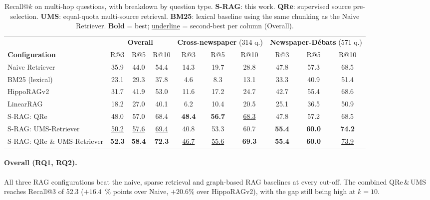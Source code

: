 \begin{table}[ht]
\centering
\small
\setlength{\tabcolsep}{4pt}
\begin{tabular*}{\textwidth}{@{\extracolsep{\fill}} l ccc ccc ccc @{}}
\toprule
 & \multicolumn{3}{c}{\textbf{Overall}} & \multicolumn{3}{c}{\textbf{Cross-newspaper} (314 q.)} & \multicolumn{3}{c}{\textbf{Newspaper-Débats} (571 q.)} \\
\cmidrule(lr){2-4} \cmidrule(lr){5-7} \cmidrule(lr){8-10}
\textbf{Configuration} & R@3 & R@5 & R@10 & R@3 & R@5 & R@10 & R@3 & R@5 & R@10 \\
\midrule
Naive Retriever~\cite{historiqa-pellet}              & 35.9 & 44.0 & 54.4 & 14.3 & 19.7 & 28.8 & 47.8 & 57.3 & 68.5 \\
BM25 (lexical)~\cite{bm25}                    & 23.1 & 29.3 & 37.8 &  4.6 &  8.3 & 13.1 & 33.3 & 40.9 & 51.4 \\
HippoRAGv2~\cite{hipporagv2}                  & 31.7 & 41.9 & 53.0 & 11.6 & 17.2 & 24.7 & 42.7 & 55.4 & 68.6 \\
LinearRAG~\cite{linearrag_2025}               & 18.2 & 27.0 & 40.1 & 6.2 & 10.4 & 20.5 & 25.1 & 36.5 & 50.9 \\
\midrule
S-RAG: QRe                                    & 48.0 & 57.0 & 68.4 & \textbf{48.4} & \textbf{56.7} & \underline{68.3} & 47.8 & 57.2 & 68.5 \\
S-RAG: UMS-Retriever                          & \underline{50.2} & \underline{57.6} & \underline{69.4} & 40.8 & 53.3 & 60.7 & \textbf{55.4} & \textbf{60.0} & \textbf{74.2} \\
S-RAG: QRe \& UMS-Retriever                   & \textbf{52.3} & \textbf{58.4} & \textbf{72.3} & \underline{46.7} & \underline{55.6} & \textbf{69.3} & \textbf{55.4} & \textbf{60.0} & \underline{73.9} \\
\bottomrule
\end{tabular*}
\caption{Recall@$k$ on multi-hop questions, with breakdown by question type.
\textbf{S-RAG}: this work. \textbf{QRe}: supervised source pre-selection.
\textbf{UMS}: equal-quota multi-source retrieval.
\textbf{BM25}: lexical baseline using the same chunking as the Naive Retriever.
\textbf{Bold} = best; \underline{underline} = second-best per column (Overall).}
\label{tab:retrieval-results}
\end{table}

\paragraph{Overall (RQ1, RQ2).}
All three RAG configurations beat the naive, sparse retrieval and graph-based RAG baselines at every cut-off. The combined QRe\,\&\,UMS reaches Recall@3 of 52.3
($+16.4$~\% points over Naive, $+20.6\%$ over HippoRAGv2), with the gap still being high at $k{=}10$.

